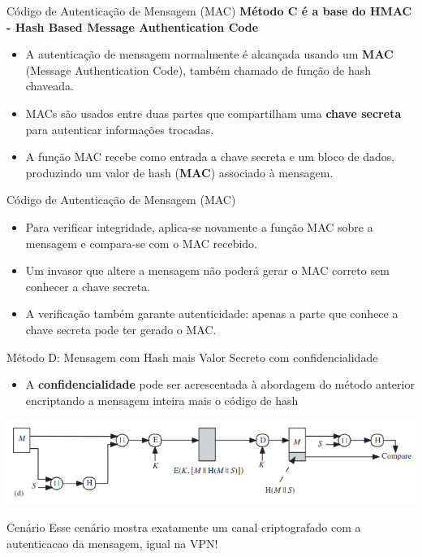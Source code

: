 \begin{frame}{Código de Autenticação de Mensagem (MAC)}
    \textbf{Método C é a base do HMAC - Hash Based Message Authentication Code}
    \begin{itemize}
        \item A autenticação de mensagem normalmente é alcançada usando um \textbf{MAC} (Message Authentication Code), também chamado de função de hash chaveada.
        \item MACs são usados entre duas partes que compartilham uma \textbf{chave secreta} para autenticar informações trocadas.
        \item A função MAC recebe como entrada a chave secreta e um bloco de dados, produzindo um valor de hash (\textbf{MAC}) associado à mensagem.
    \end{itemize}

\end{frame}
\begin{frame}{Código de Autenticação de Mensagem (MAC)}
    \begin{itemize}
        \item Para verificar integridade, aplica-se novamente a função MAC sobre a mensagem e compara-se com o MAC recebido.
        \item Um invasor que altere a mensagem não poderá gerar o MAC correto sem conhecer a chave secreta.
        \item A verificação também garante autenticidade: apenas a parte que conhece a chave secreta pode ter gerado o MAC.
    \end{itemize}


\end{frame}

\begin{frame}{Método D: Mensagem com Hash mais Valor Secreto com confidencialidade}
    \begin{itemize}
        \item A \textbf{confidencialidade} pode ser acrescentada à abordagem do método anterior encriptando a mensagem inteira mais o código de hash
    \end{itemize}

    \centering
    \includegraphics[width=0.7\linewidth]{Figuras/esquema4-hash.png}

    \begin{block}{Cenário}
        Esse cenário mostra exatamente um canal criptografado com a autenticacao da mensagem, igual na VPN!
    \end{block}
\end{frame}

